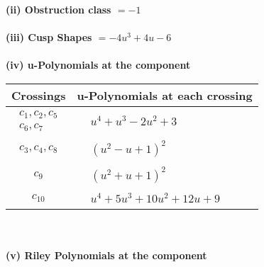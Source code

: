 \documentclass[1p]{elsarticle_modified}
\theoremstyle{definition}
\begin{document}
\flushleft \textbf{(ii) Obstruction class $= -1$}\\~\\
\flushleft \textbf{(iii) Cusp Shapes $= -4 u^3+4 u-6$}\\~\\
\newpage\renewcommand{\arraystretch}{1}
\flushleft \textbf{(iv) u-Polynomials at the component}\newline \\
\begin{tabular}{m{50pt}|m{274pt}}
Crossings & \hspace{64pt}u-Polynomials at each crossing \\
\hline $$\begin{aligned}c_{1},c_{2},c_{5}\\c_{6},c_{7}\end{aligned}$$&$\begin{aligned}
&u^4+u^3-2 u^2+3
\end{aligned}$\\
\hline $$\begin{aligned}c_{3},c_{4},c_{8}\end{aligned}$$&$\begin{aligned}
&(u^2- u+1)^2
\end{aligned}$\\
\hline $$\begin{aligned}c_{9}\end{aligned}$$&$\begin{aligned}
&(u^2+u+1)^2
\end{aligned}$\\
\hline $$\begin{aligned}c_{10}\end{aligned}$$&$\begin{aligned}
&u^4+5 u^3+10 u^2+12 u+9
\end{aligned}$\\
\hline
\end{tabular}\\~\\
\newpage\renewcommand{\arraystretch}{1}
\flushleft \textbf{(v) Riley Polynomials at the component}\newline \\
\end{document}
